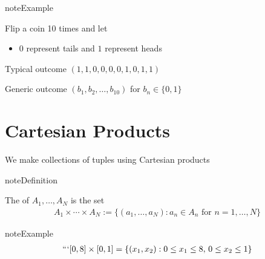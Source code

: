 \documentclass[letterpaper,10pt,english]{jupyterBook}
\begin{document}
\begin{sphinxadmonition}{note}{Example}

\sphinxAtStartPar
Flip a coin 10 times and let
\begin{itemize}
\item {} 
\sphinxAtStartPar
\(0\) represent tails and \(1\) represent heads

\end{itemize}

\sphinxAtStartPar
Typical outcome \((1, 1, 0, 0, 0, 0, 1, 0, 1, 1)\)

\sphinxAtStartPar
Generic outcome \((b_1, b_2, \ldots, b_{10})\)  for \(b_n \in \{0, 1\}\)
\end{sphinxadmonition}


\section{Cartesian Products}
\label{\detokenize{03.set_theory:cartesian-products}}
\sphinxAtStartPar
We make collections of tuples using Cartesian products

\begin{sphinxadmonition}{note}{Definition}

\sphinxAtStartPar
The  of \(A_1, \ldots, A_N\) is the set
\begin{equation*}
\begin{split}
A_1 \times \cdots \times A_N
:= \{ (a_1, \ldots, a_N) : a_n \in A_n \text{ for } n =1, \ldots, N \}
\end{split}
\end{equation*}\end{sphinxadmonition}

\begin{sphinxadmonition}{note}{Example}
\begin{equation*}
\begin{split}
```[0, 8] \times [0, 1] = \{ (x_1,x_2) : 0 \leq x_1 \leq 8, \, 0 \leq x_2 \leq 1 \}
\end{split}
\end{equation*}\end{sphinxadmonition}

\begin{figure}[htbp]
\centering

\noindent{}
\end{figure}
\end{document}
